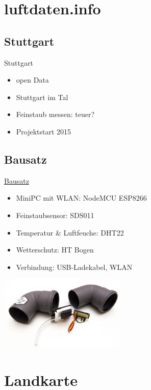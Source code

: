 \documentclass[aspectratio=169]{beamer} %
\begin{document}
\section{luftdaten.info}
\subsection{Stuttgart}
\begin{frame}{Stuttgart}
  \begin{itemize}
  \item open Data
  \item Stuttgart im Tal
  \item Feinstaub messen: teuer?
  \item Projektstart 2015
  \end{itemize}
\end{frame}

\subsection{Bausatz}
\begin{frame}{\href{http://luftdaten.info/feinstaubsensor-bauen/}{Bausatz}}
  \begin{itemize}
  \item MiniPC mit WLAN: NodeMCU ESP8266
  \item Feinstaubsensor: SDS011
  \item Temperatur \& Luftfeuche: DHT22 
  \item Wetterschutz: HT Bogen
  \item Verbindung: USB-Ladekabel, WLAN
  \end{itemize}
  \begin{center}
    \includegraphics[width=6cm]{../screenshots/Feinstaub-Sensor-Bausatz-e1479558693357.jpg}
  \end{center}
\end{frame}

\section{Landkarte}
\end{document}
